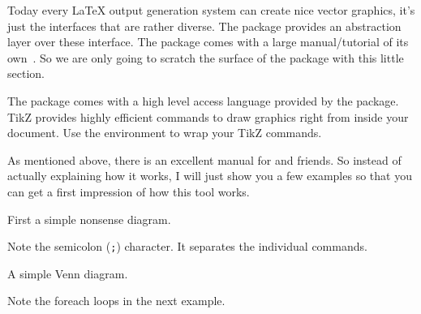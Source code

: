 Today every \LaTeX{} output generation system can create nice vector graphics,
it's just the interfaces that are rather diverse. The  package provides an
abstraction layer over these interface. The
 package comes with a large manual/tutorial of its own~\cite{pgfplot}.
So we are only going to scratch the surface of the package with this little
section.

The  package comes with a high level access language provided by the   package.
TikZ provides highly efficient commands to
draw graphics right from inside your document. Use the 
environment to wrap your TikZ commands.

As mentioned above, there is an excellent manual for  and friends. So
instead of actually explaining how it works, I will just show you a few examples
so that you can get a first impression of how this tool works.

First a simple nonsense diagram.
\begin{example}
\end{example}
Note the semicolon (\texttt{;}) character. It separates the individual commands.

A simple Venn diagram.
\begin{example}
\end{example}

Note the foreach loops in the next example.
\begin{example}
\end{example}

